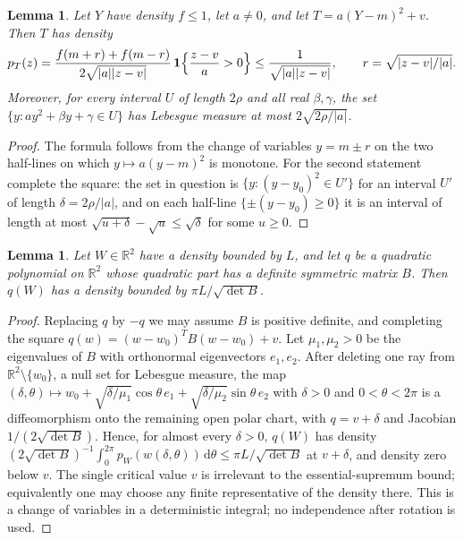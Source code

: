 \documentclass[11pt]{amsart}
\numberwithin{equation}{section}
\newtheorem{lemma}[theorem]{Lemma}
\theoremstyle{definition}
\theoremstyle{remark}
\newcommand{\R}{\mathbb R}
\newcommand{\1}{\mathbf 1}
\newcommand{\dd}{\,\mathrm d}
\newcommand{\abs}[1]{\lvert #1\rvert}
\begin{document}
\begin{lemma}\label{lem:square}
Let $Y$ have density $f\le1$, let $a\ne0$, and let $T=a(Y-m)^2+v$. Then $T$ has density
\[
p_T(z)=\frac{f(m+r)+f(m-r)}{2\sqrt{\abs a\abs{z-v}}}\,\1\Bigl\{\frac{z-v}{a}>0\Bigr\}\le\frac1{\sqrt{\abs a\abs{z-v}}},\qquad r=\sqrt{\abs{z-v}/\abs a}.
\]
Moreover, for every interval $U$ of length $2\rho$ and all real $\beta,\gamma$, the set $\{y:ay^2+\beta y+\gamma\in U\}$ has Lebesgue measure at most $2\sqrt{2\rho/\abs a}$.
\end{lemma}

\begin{proof}
The formula follows from the change of variables $y=m\pm r$ on the two half-lines on which $y\mapsto a(y-m)^2$ is monotone. For the second statement complete the square: the set in question is $\{y:(y-y_0)^2\in U'\}$ for an interval $U'$ of length $\delta=2\rho/\abs a$, and on each half-line $\{\pm(y-y_0)\ge0\}$ it is an interval of length at most $\sqrt{u+\delta}-\sqrt u\le\sqrt\delta$ for some $u\ge0$.
\end{proof}

\begin{lemma}\label{lem:definite}
Let $W\in\R^2$ have a density bounded by $L$, and let $q$ be a quadratic polynomial on $\R^2$ whose quadratic part has a definite symmetric matrix $B$. Then $q(W)$ has a density bounded by $\pi L/\sqrt{\det B}$.
\end{lemma}

\begin{proof}
Replacing $q$ by $-q$ we may assume $B$ is positive definite, and completing the square $q(w)=(w-w_0)^TB(w-w_0)+v$. Let $\mu_1,\mu_2>0$ be the eigenvalues of $B$ with orthonormal eigenvectors $e_1,e_2$. After deleting one ray from $\R^2\setminus\{w_0\}$, a null set for Lebesgue measure, the map $(\delta,\theta)\mapsto w_0+\sqrt{\delta/\mu_1}\cos\theta\,e_1+\sqrt{\delta/\mu_2}\sin\theta\,e_2$ with $\delta>0$ and $0<\theta<2\pi$ is a diffeomorphism onto the remaining open polar chart, with $q=v+\delta$ and Jacobian $1/(2\sqrt{\det B})$. Hence, for almost every $\delta>0$, $q(W)$ has density $(2\sqrt{\det B})^{-1}\int_0^{2\pi}p_W(w(\delta,\theta))\dd\theta\le\pi L/\sqrt{\det B}$ at $v+\delta$, and density zero below $v$. The single critical value $v$ is irrelevant to the essential-supremum bound; equivalently one may choose any finite representative of the density there. This is a change of variables in a deterministic integral; no independence after rotation is used.
\end{proof}
\end{document}
